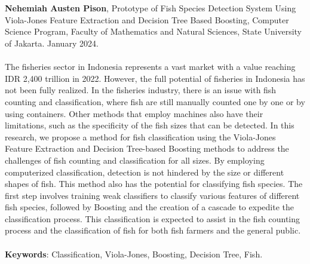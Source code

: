 \chapter*{}
\singlespacing{}

\textbf{Nehemiah Austen Pison}, Prototype of Fish Species Detection System 
Using Viola-Jones Feature Extraction and Decision Tree Based Boosting, Computer Science Program, Faculty of 
Mathematics and Natural Sciences, State University of Jakarta. January 2024.
\\
\\

The fisheries sector in Indonesia represents a vast market with a 
value reaching IDR 2,400 trillion in 2022. However, the full potential 
of fisheries in Indonesia has not been fully realized. In the fisheries 
industry, there is an issue with fish counting and classification, where 
fish are still manually counted one by one or by using containers. Other 
methods that employ machines also have their limitations, such as the 
specificity of the fish sizes that can be detected. In this research, 
we propose a method for fish classification using the Viola-Jones Feature 
Extraction and Decision Tree-based Boosting methods to address the challenges 
of fish counting and classification for all sizes. By employing computerized 
classification, detection is not hindered by the size or different shapes of 
fish. This method also has the potential for classifying fish species. The 
first step involves training weak classifiers to classify various features of 
different fish species, followed by Boosting and the creation of a cascade to 
expedite the classification process. This classification is expected to assist 
in the fish counting process and the classification of fish for both fish 
farmers and the general public.
\\
\\
\textbf{Keywords}: Classification, Viola-Jones, Boosting, Decision Tree, Fish.